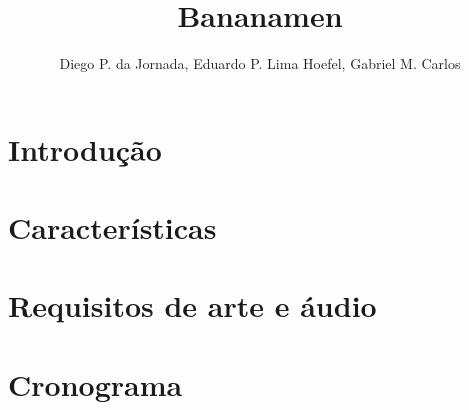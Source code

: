 \documentclass[12pt]{article}
\title{Bananamen}
\author{Diego P. da Jornada, Eduardo P. Lima Hoefel, Gabriel M. Carlos}
\begin{document}
 

\maketitle

\section{Introdução}

\section{Características}

\section{Requisitos de arte e áudio}

\section{Cronograma}
\end{document}
